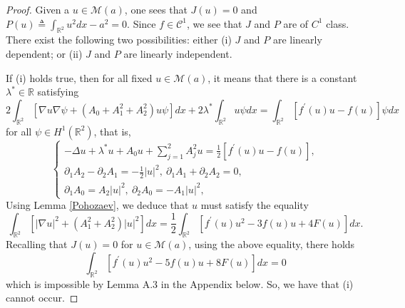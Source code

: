 \documentclass[11pt]{amsart}
\numberwithin{equation}{section}
\theoremstyle{definition}
\newcommand{\R}{\mathbb{R}}
\begin{document}
\begin{proof}
Given a $u\in \mathcal{M}(a)$, one sees that $J(u)=0$ and $P(u)\triangleq\int_{\R^2}u^2dx-a^2=0$.
Since $f\in \mathcal{C}^1$, we see that $J$ and $P$ are of $C^1$ class.
There exist the following two possibilities: either (i) $J$ and $P$ are linearly dependent; or (ii)
$J$ and $P$ are linearly independent.

If (i) holds true, then for all fixed $u\in \mathcal{M}(a)$, it means that there is a constant $\lambda^*\in\R$ satisfying
\[
2\int_{\R^2}[ \nabla u\nabla\psi  + (A_0+A_1^2+A_2^2)u\psi]dx+2\lambda^*\int_{\R^2}u\psi dx
=\int_{\R^2}[f^\prime(u)u-f(u)]\psi dx
\]
for all $\psi\in H^1(\R^2)$,
that is,
\[ \left\{
  \begin{array}{ll}
\displaystyle    -\Delta u +\lambda^* u+A_0 u+\sum\limits_{j=1}^2A_j^2 u=\frac12 [f^\prime(u)u-f(u)], \\
 \displaystyle     \partial_1A_2-\partial_2A_1=-\frac{1}{2}|u|^2,~\partial_1A_1+\partial_2A_2=0,\\
 \displaystyle    \partial_1A_0=A_2|u|^2,~ \partial_2A_0=-A_1|u|^2,
  \end{array}
\right.
\]
Using Lemma \ref{Pohozaev}, we deduce that $u$ must satisfy the equality
\[
 \int_{\R^2}[|\nabla u|^2 + (A_1^2+A_2^2)|u|^2]dx=\frac12\int_{\R^2}[f^\prime(u)u^2-3f(u)u+4F(u)]dx.
\]
Recalling that $J(u)=0$ for $u\in \mathcal{M}(a)$, using the above equality, there holds
\[
\int_{\R^2}[f^\prime(u)u^2-5f(u)u+8F(u)]dx=0
\]
which is impossible by Lemma A.3 in the Appendix below. So, we have that (i) cannot occur.


\end{proof}
\end{document}
